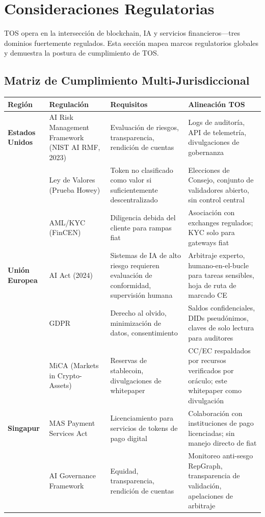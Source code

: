 \documentclass[11pt]{article}
\begin{document}
\section{Consideraciones Regulatorias}
\label{sec:regulatory}

TOS opera en la intersección de blockchain, IA y servicios financieros—tres dominios fuertemente regulados. Esta sección mapea marcos regulatorios globales y demuestra la postura de cumplimiento de TOS.

\subsection{Matriz de Cumplimiento Multi-Jurisdiccional}

\begin{longtable}{@{}p{}p{}p{}p{}@{}}
\toprule
\textbf{Región} & \textbf{Regulación} & \textbf{Requisitos} & \textbf{Alineación TOS} \\\midrule
\textbf{Estados Unidos} & AI Risk Management Framework (NIST AI RMF, 2023) & Evaluación de riesgos, transparencia, rendición de cuentas & Logs de auditoría, API de telemetría, divulgaciones de gobernanza \\
 & Ley de Valores (Prueba Howey) & Token no clasificado como valor si suficientemente descentralizado & Elecciones de Consejo, conjunto de validadores abierto, sin control central \\
 & AML/KYC (FinCEN) & Diligencia debida del cliente para rampas fiat & Asociación con exchanges regulados; KYC solo para gateways fiat \\
\textbf{Unión Europea} & AI Act (2024) & Sistemas de IA de alto riesgo requieren evaluación de conformidad, supervisión humana & Arbitraje experto, humano-en-el-bucle para tareas sensibles, hoja de ruta de marcado CE \\
 & GDPR & Derecho al olvido, minimización de datos, consentimiento & Saldos confidenciales, DIDs pseudónimos, claves de solo lectura para auditores \\
 & MiCA (Markets in Crypto-Assets) & Reservas de stablecoin, divulgaciones de whitepaper & CC/EC respaldados por recursos verificados por oráculo; este whitepaper como divulgación \\
\textbf{Singapur} & MAS Payment Services Act & Licenciamiento para servicios de tokens de pago digital & Colaboración con instituciones de pago licenciadas; sin manejo directo de fiat \\
 & AI Governance Framework & Equidad, transparencia, rendición de cuentas & Monitoreo anti-sesgo RepGraph, transparencia de validación, apelaciones de arbitraje \\

\end{longtable}
\end{document}
